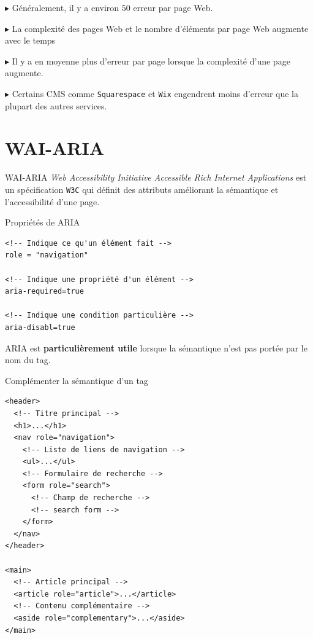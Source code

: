 \documentclass{report}
\begin{document}
\begin{multicols*}{2}
$\blacktriangleright$ Généralement, il y a environ $50$ erreur par page Web. 


$\blacktriangleright$ La complexité des pages Web et le nombre d'éléments par page Web augmente avec le temps 


$\blacktriangleright$ Il y a en moyenne plus d'erreur par page lorsque la complexité d'une page augmente. 

$\blacktriangleright$ Certains CMS comme \texttt{Squarespace} et \texttt{Wix} engendrent moins d'erreur que 
la plupart des autres services. 

\section{WAI-ARIA}
\begin{Definitionx}{WAI-ARIA}{}
    \textit{Web Accessibility Initiative Accessible Rich Internet Applications} est un spécification 
    \texttt{W3C} qui définit des attributs améliorant la sémantique et l'accessibilité d'une page.   
\end{Definitionx}

\begin{EExample}{Propriétés de ARIA}{}
    \begin{lstlisting}[style=HTMLDraculaDark]
<!-- Indique ce qu'un élément fait --> 
role = "navigation"

<!-- Indique une propriété d'un élément -->
aria-required=true

<!-- Indique une condition particulière -->
aria-disabl=true
    \end{lstlisting}
\end{EExample}


\begin{note}{}{}
    ARIA est \textbf{particulièrement utile} lorsque la sémantique n'est pas portée par le nom du tag.   
\end{note}


\begin{EExample}{Complémenter la sémantique d'un tag}{}
\begin{lstlisting}[style=HTMLDraculaDark]
<header>
  <!-- Titre principal -->
  <h1>...</h1>
  <nav role="navigation">
    <!-- Liste de liens de navigation -->
    <ul>...</ul>
    <!-- Formulaire de recherche -->
    <form role="search">
      <!-- Champ de recherche -->
      <!-- search form -->
    </form>
  </nav>
</header>

<main>
  <!-- Article principal -->
  <article role="article">...</article>
  <!-- Contenu complémentaire -->
  <aside role="complementary">...</aside>
</main>


\end{lstlisting}
\end{EExample}
\end{multicols*}
\end{document}
